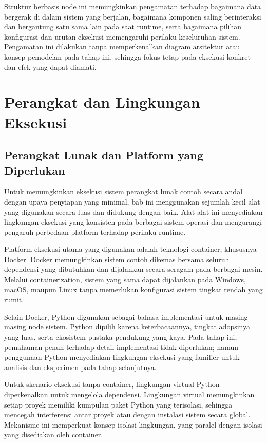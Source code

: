 Struktur berbasis node ini memungkinkan pengamatan terhadap bagaimana data
bergerak di dalam sistem yang berjalan, bagaimana komponen saling berinteraksi
dan bergantung satu sama lain pada saat runtime, serta bagaimana pilihan
konfigurasi dan urutan eksekusi memengaruhi perilaku keseluruhan sistem.
Pengamatan ini dilakukan tanpa memperkenalkan diagram arsitektur atau konsep
pemodelan pada tahap ini, sehingga fokus tetap pada eksekusi konkret dan efek
yang dapat diamati.


\section{Perangkat dan Lingkungan Eksekusi}
\subsection{Perangkat Lunak dan Platform yang Diperlukan}

Untuk memungkinkan eksekusi sistem perangkat lunak contoh secara andal dengan
upaya penyiapan yang minimal, bab ini menggunakan sejumlah kecil alat yang
digunakan secara luas dan didukung dengan baik. Alat-alat ini menyediakan
lingkungan eksekusi yang konsisten pada berbagai sistem operasi dan mengurangi
pengaruh perbedaan platform terhadap perilaku runtime.

Platform eksekusi utama yang digunakan adalah teknologi container, khususnya
Docker. Docker memungkinkan sistem contoh dikemas bersama seluruh dependensi yang
dibutuhkan dan dijalankan secara seragam pada berbagai mesin. Melalui
containerization, sistem yang sama dapat dijalankan pada Windows, macOS, maupun
Linux tanpa memerlukan konfigurasi sistem tingkat rendah yang rumit.

Selain Docker, Python digunakan sebagai bahasa implementasi untuk masing-masing
node sistem. Python dipilih karena keterbacaannya, tingkat adopsinya yang luas,
serta ekosistem pustaka pendukung yang kaya. Pada tahap ini, pemahaman penuh
terhadap detail implementasi tidak diperlukan; namun penggunaan Python
menyediakan lingkungan eksekusi yang familier untuk analisis dan eksperimen pada
tahap selanjutnya.

Untuk skenario eksekusi tanpa container, lingkungan virtual Python diperkenalkan
untuk mengelola dependensi. Lingkungan virtual memungkinkan setiap proyek
memiliki kumpulan paket Python yang terisolasi, sehingga mencegah interferensi
antar proyek atau dengan instalasi sistem secara global. Mekanisme ini
memperkuat konsep isolasi lingkungan, yang paralel dengan isolasi yang disediakan
oleh container.

